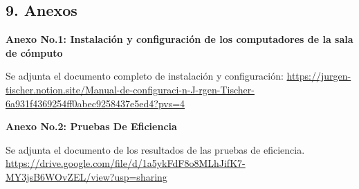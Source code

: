 \begin{spacing}{1.5}
  \begin{tightcenter}
    \section{9. Anexos}
    \mylinespacing
  \end{tightcenter}

  \textbf{Anexo No.1: Instalación y configuración de los computadores de la
    sala de cómputo}

  Se adjunta el documento completo de instalación y configuración: \url{https://jurgen-tischer.notion.site/Manual-de-configuraci-n-J-rgen-Tischer-6a931f4369254ff0abec9258437e5ed4?pvs=4}

  \textbf{Anexo No.2: Pruebas De Eficiencia}

  Se adjunta el documento de los resultados de las pruebas de eficiencia. \url{https://drive.google.com/file/d/1a5ykFdF8o8MLhJifK7-MY3jsB6WOvZEL/view?usp=sharing}

  \mylinespacing
  \mylinespacing
  \begin{tightcenter}
  \end{tightcenter}
\end{spacing}